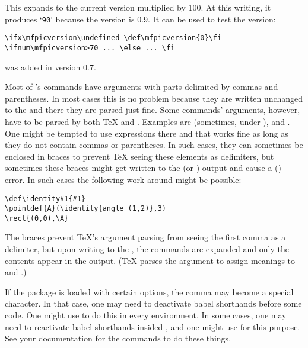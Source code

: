 \documentclass[letterpaper]{article}
\begin{document}
\begin{cd}
%
\end{cd}

This expands to the current \mfp{} version multiplied by 100. At this
writing, it produces `\texttt{90}' because the version is 0.9. It can
be used to test the version:
\begin{verbatim}
\ifx\mfpicversion\undefined \def\mfpicversion{0}\fi
\ifnum\mfpicversion>70 ... \else ... \fi
\end{verbatim}
 was added in version 0.7.


Most of \mfp{}'s commands have arguments with parts delimited by commas
and parentheses. In most cases this is no problem because they are
written unchanged to the  and there they are parsed just fine.
Some commands' arguments, however, have to be parsed by both \TeX{} and
\MF{}. Examples are  (sometimes, under ), and
. One might be tempted to use \MP{} expressions there and
that works fine as long as they do not contain commas or parentheses. In
such cases, they can sometimes be enclosed in braces to prevent \TeX{}
seeing these elements as delimiters, but sometimes these braces might
get written to the  (or ) output and cause a \MF{}
(\MP{}) error. In such cases the following work-around might be possible:
\begin{verbatim}
\def\identity#1{#1}
\pointdef{A}(\identity{angle (1,2)},3)
\rect{(0,0),\A}
\end{verbatim}

The braces prevent \TeX{}'s argument parsing from seeing the first comma
as a delimiter, but upon writing to the , the 
commands are expanded and only the contents appear in the output. (\TeX{}
parses the argument to assign meanings to  and .)

If the  package is loaded with certain options, the comma
may become a special character. In that case, one may need to deactivate
babel shorthands before some \mfp{} code. One might use 
to do this in every  environment. In some cases, one may need
to reactivate babel shorthands insided , and one might use
 for this purpose. See your  documentation
for the commands to do these things.

\clearpage

\def\sectionmark#1{\markright {\thesection\quad#1}}%
\def\subsectionmark#1{}
\def\subsubsectionmark#1{}
\thispagestyle{plain}
\end{document}
